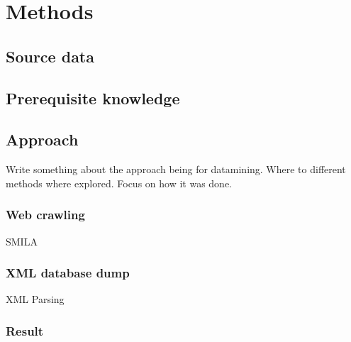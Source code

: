 
\chapter{Methods}

\section{Source data}

\section{Prerequisite knowledge}

\section{Approach}

Write something about the approach being for datamining. Where to different methods where explored. Focus on how it was done.

\subsection{Web crawling}

SMILA

\subsection{XML database dump}

XML Parsing

\subsection{Result}

\cleardoublepage
